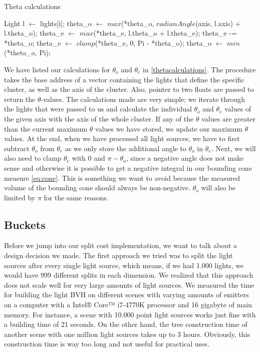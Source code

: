\begin{algorithm}
	\caption{Theta calculations}
	\label{thetacalculations}
	\begin{algorithmic}[1] %
			\State Light l $\gets$ lights[i];
			\State 	*theta\_o $\gets$ $max$(*theta\_o, $radianAngle$(axis, l.axis) + l.theta\_o);
			\State *theta\_e $\gets$ $max$(*theta\_e, l.theta\_o + l.theta\_e);
		\EndFor
		\State *theta\_e -= *theta\_o;
		\State *theta\_e $\gets$ $clamp$(*theta\_e, 0, Pi - *theta\_o);
		\State *theta\_o $\gets$ $min$(*theta\_o, Pi);
		\EndProcedure
	\end{algorithmic}
\end{algorithm}

We have listed our calculations for $\theta_o$ and $\theta_e$ in \ref{thetacalculations}. The procedure takes the base address of a vector containing the lights that define the specific cluster, as well as the axis of the cluster. Also, pointer to two floats are passed to return the $\theta$-values. The calculations made are very simple; we iterate through the lights that were passed to us and calculate the individual $\theta_o$ and $\theta_e$ values of the given axis with the axis of the whole cluster. If any of the $\theta$ values are greater than the current maximum $\theta$ values we have stored, we update our maximum $\theta$ values. At the end, when we have processed all light sources, we have to first subtract $\theta_o$ from $\theta_e$ as we only store the additional angle to $\theta_o$ in $\theta_e$. Next, we will also need to clamp $\theta_e$ with 0 and $\pi - \theta_o$, since a negative angle does not make sense and otherwise it is possible to get a negative integral in our bounding cone measure \ref{eq:cone}. This is something we want to avoid because the measured volume of the bounding cone should always be non-negative. $\theta_o$ will also be limited by $\pi$ for the same reasons.

\subsection{Buckets}
\label{subs:buckets}

Before we jump into our split cost implementation, we want to talk about a design decision we made. The first approach we tried was to split the light sources after every single light source, which means, if we had 1.000 lights, we would have 999 different splits in each dimension. We realized that this approach does not scale well for very large amounts of light sources. We measured the time for building the light BVH on different scenes with varying amounts of emitters on a computer with a Intel® Core™ i7-4770K processor and 16 gigabyte of main memory. For instance, a scene with 10.000 point light sources works just fine with a building time of 21 seconds. On the other hand, the tree construction time of another scene with one million light sources takes up to 3 hours. Obviously, this construction time is way too long and not useful for practical uses. 

